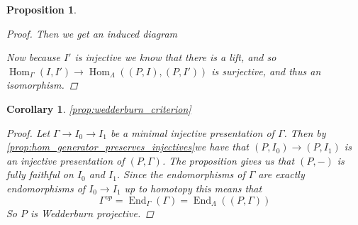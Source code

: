 \documentclass[11pt, a4paper, english]{article}
\newtheorem{cor}{Corollary}[theorem]
\newtheorem{prop}[theorem]{Proposition}
\theoremstyle{definition}
\DeclareMathOperator{\Hom}{Hom}
\DeclareMathOperator{\End}{End}
\begin{document}
\begin{prop}
\begin{proof}
		Then we get an induced diagram
		\begin{center}
		\end{center}
		Now because $I'$ is injective we know that there is a lift, and so $\Hom_\Gamma(I, I') \to \Hom_\Lambda((P,I), (P, I'))$ is surjective, and thus an isomorphism.
	\end{proof} 
\end{prop}

\begin{cor}
	\cref{prop:wedderburn_criterion}
	\begin{proof}
		Let $\Gamma \to I_0 \to I_1$ be a minimal injective presentation of $\Gamma$. Then by \cref{prop:hom_generator_preserves_injectives}we have that $(P, I_0) \to (P,I_1)$ is an injective presentation of $(P,\Gamma)$. The proposition gives us that $(P,-)$ is fully faithful on $I_0$ and $I_1$. Since the endomorphisms of $\Gamma$ are exactly endomorphisms of $I_0 \to I_1$ up to homotopy this means that $$\Gamma^{op}=\End_\Gamma(\Gamma) = \End_\Lambda((P, \Gamma))$$
		So $P$ is Wedderburn projective.
	\end{proof}
\end{cor}
\end{document}
